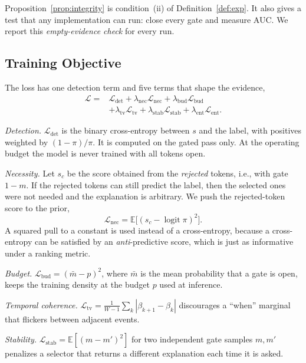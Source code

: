 \documentclass[pdflatex,sn-basic]{sn-jnl}
\newcommand{\Lcal}{\mathcal{L}}
\theoremstyle{definition}
\theoremstyle{plain}
\begin{document}
Proposition~\ref{prop:integrity} is condition~(ii) of
Definition~\ref{def:exp}. It also gives a test that any implementation can
run: close every gate and measure AUC. We report this \emph{empty-evidence
check} for every run.

\subsection{Training Objective}
The loss has one detection term and five terms that shape the evidence,
\begin{equation}
\begin{split}
\Lcal={}&\Lcal_{\text{det}}+\lambda_{\text{nec}}\Lcal_{\text{nec}}
+\lambda_{\text{bud}}\Lcal_{\text{bud}}\\
&+\lambda_{\text{tv}}\Lcal_{\text{tv}}
+\lambda_{\text{stab}}\Lcal_{\text{stab}}+\lambda_{\text{ent}}\Lcal_{\text{ent}}.
\end{split}
\label{eq:loss}
\end{equation}

\emph{Detection.} $\Lcal_{\text{det}}$ is the binary cross-entropy between
$s$ and the label, with positives weighted by $(1-\pi)/\pi$. It is computed on
the gated pass only. At the operating budget the model is never trained with
all tokens open.

\emph{Necessity.} Let $s_c$ be the score obtained from the \emph{rejected}
tokens, i.e., with gate $1-m$. If the rejected tokens can still predict the
label, then the selected ones were not needed and the explanation is
arbitrary. We push the rejected-token score to the prior,
\begin{equation}
\Lcal_{\text{nec}}=\mathbb{E}\big[(s_c-\operatorname{logit}\pi)^2\big].
\label{eq:nec}
\end{equation}
A squared pull to a constant is used instead of a cross-entropy, because a
cross-entropy can be satisfied by an \emph{anti}-predictive score, which is
just as informative under a ranking metric.

\emph{Budget.} $\Lcal_{\text{bud}}=(\bar{m}-p)^2$, where $\bar{m}$ is the mean
probability that a gate is open, keeps the training density at the budget $p$
used at inference.

\emph{Temporal coherence.}
$\Lcal_{\text{tv}}=\frac{1}{W-1}\sum_k|\beta_{k+1}-\beta_k|$ discourages a
``when'' marginal that flickers between adjacent events.

\emph{Stability.} $\Lcal_{\text{stab}}=\mathbb{E}[(m-m')^2]$ for two
independent gate samples $m,m'$ penalizes a selector that returns a different
explanation each time it is asked.
\end{document}
